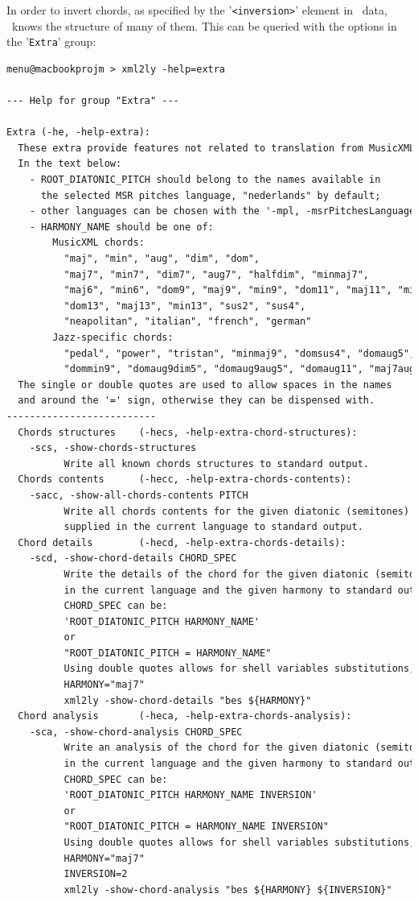 \documentclass[12pt,a4paper]{article}
\begin{document}
In order to invert chords, as specified by the '{\tt <inversion>}' element in \mxml\ data, \mxmlToLy\ knows the structure of many of them. This can be queried with the options in the '{\tt Extra}' group:
\begin{lstlisting}[language=XML]
menu@macbookprojm > xml2ly -help=extra

--- Help for group "Extra" ---

Extra (-he, -help-extra):
  These extra provide features not related to translation from MusicXML to other formats.
  In the text below:
    - ROOT_DIATONIC_PITCH should belong to the names available in
      the selected MSR pitches language, "nederlands" by default;
    - other languages can be chosen with the '-mpl, -msrPitchesLanguage' option;
    - HARMONY_NAME should be one of:
        MusicXML chords:
          "maj", "min", "aug", "dim", "dom",
          "maj7", "min7", "dim7", "aug7", "halfdim", "minmaj7",
          "maj6", "min6", "dom9", "maj9", "min9", "dom11", "maj11", "min11",
          "dom13", "maj13", "min13", "sus2", "sus4",
          "neapolitan", "italian", "french", "german"
        Jazz-specific chords:
          "pedal", "power", "tristan", "minmaj9", "domsus4", "domaug5",
          "dommin9", "domaug9dim5", "domaug9aug5", "domaug11", "maj7aug11"
  The single or double quotes are used to allow spaces in the names
  and around the '=' sign, otherwise they can be dispensed with.
--------------------------
  Chords structures    (-hecs, -help-extra-chord-structures):
    -scs, -show-chords-structures
          Write all known chords structures to standard output.
  Chords contents      (-hecc, -help-extra-chords-contents):
    -sacc, -show-all-chords-contents PITCH
          Write all chords contents for the given diatonic (semitones) PITCH,
          supplied in the current language to standard output.
  Chord details        (-hecd, -help-extra-chords-details):
    -scd, -show-chord-details CHORD_SPEC
          Write the details of the chord for the given diatonic (semitones) pitch
          in the current language and the given harmony to standard output.
          CHORD_SPEC can be:
          'ROOT_DIATONIC_PITCH HARMONY_NAME'
          or
          "ROOT_DIATONIC_PITCH = HARMONY_NAME"
          Using double quotes allows for shell variables substitutions, as in:
          HARMONY="maj7"
          xml2ly -show-chord-details "bes ${HARMONY}"
  Chord analysis       (-heca, -help-extra-chords-analysis):
    -sca, -show-chord-analysis CHORD_SPEC
          Write an analysis of the chord for the given diatonic (semitones) pitch
          in the current language and the given harmony to standard output.
          CHORD_SPEC can be:
          'ROOT_DIATONIC_PITCH HARMONY_NAME INVERSION'
          or
          "ROOT_DIATONIC_PITCH = HARMONY_NAME INVERSION"
          Using double quotes allows for shell variables substitutions, as in:
          HARMONY="maj7"
          INVERSION=2
          xml2ly -show-chord-analysis "bes ${HARMONY} ${INVERSION}"
\end{lstlisting}
\end{document}
